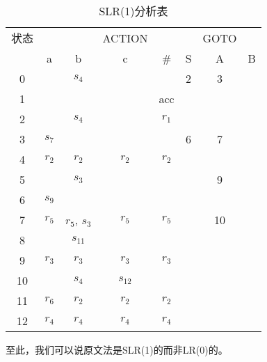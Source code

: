 \begin{table}[H]
	\caption{SLR(1)分析表}
	\centering
	\begin{tabular}{|c|cccc|ccc|}
		\hline
		状态 & & & ACTION & & & GOTO & \\
		& a & b & c & \# & S & A & B \\\hline
		0 &  & $s_{4}$ &  &  & 2 & 3 & \\
		1 &  &  &  & acc &  &  & \\
		2 &  & $s_{4}$ &  & $r_{1}$ &  &  & \\
		3 & $s_{7}$ &  &  &  & 6 & 7 & \\
		4 & $r_{2}$ & $r_{2}$ & $r_{2}$ & $r_{2}$ &  &  & \\
		5 &  & $s_{3}$ &  &  &  & 9 & \\
		6 & $s_{9}$ &  &  &  &  &  & \\
		7 & $r_{5}$ & $r_{5}$, $s_{3}$ & $r_{5}$ & $r_{5}$ &  & 10 & \\
		8 &  & $s_{11}$ &  &  &  &  & \\
		9 & $r_{3}$ & $r_{3}$ & $r_{3}$ & $r_{3}$ &  &  & \\
		10 &  & $s_{4}$ & $s_{12}$ &  &  &  & \\
		11 & $r_{6}$ & $r_{2}$ & $r_{2}$ & $r_{2}$&  &  & \\
		12 & $r_{4}$ & $r_{4}$ & $r_{4}$ & $r_{4}$ &  &  & \\\hline
	\end{tabular}
\end{table}
至此，我们可以说原文法是SLR(1)的而非LR(0)的。